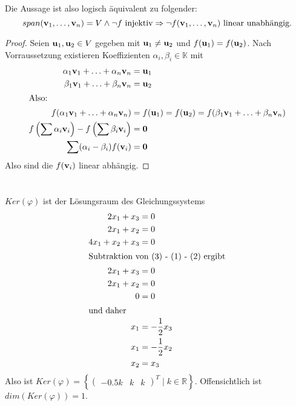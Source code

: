\documentclass{../mfa}
\begin{document}
Die Aussage ist also logisch äquivalent zu folgender:
\begin{equation*}
   span(\mathbf{v}_{1}, \ldots, \mathbf{v}_{n}) = V \wedge \neg f~\text{injektiv} \Rightarrow \neg
   f(\mathbf{v}_{1}, \ldots, \mathbf{v}_{n}) ~\text{linear unabhängig.}
\end{equation*}

\begin{proof}
Seien $\mathbf{u}_1, \mathbf{u}_2 \in V$ gegeben mit $\mathbf{u}_1 \neq \mathbf{u}_2$ und
$f(\mathbf{u}_1) =
f(\mathbf{u}_2)$. Nach Vorraussetzung existieren Koeffizienten $\alpha_i, \beta_i \in
\mathbb{K}$ mit 
\begin{align*}
   \alpha_1 \mathbf{v}_{1} + \ldots + \alpha_n \mathbf{v}_{n} &= \mathbf{u}_1 \\
   \beta_1 \mathbf{v}_{1} + \ldots + \beta_n \mathbf{v}_{n} &= \mathbf{u}_2 \\
   \intertext{Also:}
   f(\alpha_1 \mathbf{v}_{1} + \ldots + \alpha_n \mathbf{v}_{n}) &= f(\mathbf{u}_1) = f(\mathbf{u}_2) =
   f(\beta_1 \mathbf{v}_{1} + \ldots + \beta_n \mathbf{v}_{n}) \\
   f\left(\sum \alpha_i \mathbf{v}_{i}\right) - f\left(\sum \beta_i \mathbf{v}_{i}\right) &= \mathbf{0} \\
   \sum (\alpha_i - \beta_i)f(\mathbf{v}_{i}) &= \mathbf{0}
\end{align*}
Also sind die $f(\mathbf{v}_{i})$ linear abhängig.
\end{proof}

\section{}
\subsection{}
$Ker(\varphi)$ ist der Lösungsraum des Gleichungssystems
\begin{align}
   2x_1     +  x_3  &=  0 \\
   2x_1  +  x_2    &=  0 \\
   4x_1  +  x_2  +  x_3  &=  0 \\
   \intertext{Subtraktion von (3) - (1) - (2) ergibt}
   \nonumber 2x_1     +  x_3  &=  0 \\
   \nonumber 2x_1  +  x_2    &=  0 \\
   \nonumber 0      &=  0 \\
   \intertext{und daher}
   \nonumber x_1 &= -\frac{1}{2}x_3 \\
   \nonumber x_1 &= -\frac{1}{2}x_2 \\
   \nonumber x_2 &= x_3
\end{align}
Also ist $Ker(\varphi) = \left\{\begin{pmatrix} -0.5k & k & k \end{pmatrix}^T \mid k \in
\mathbb{R}\right\}$. Offensichtlich ist $dim(Ker(\varphi)) = 1$.
\end{document}
